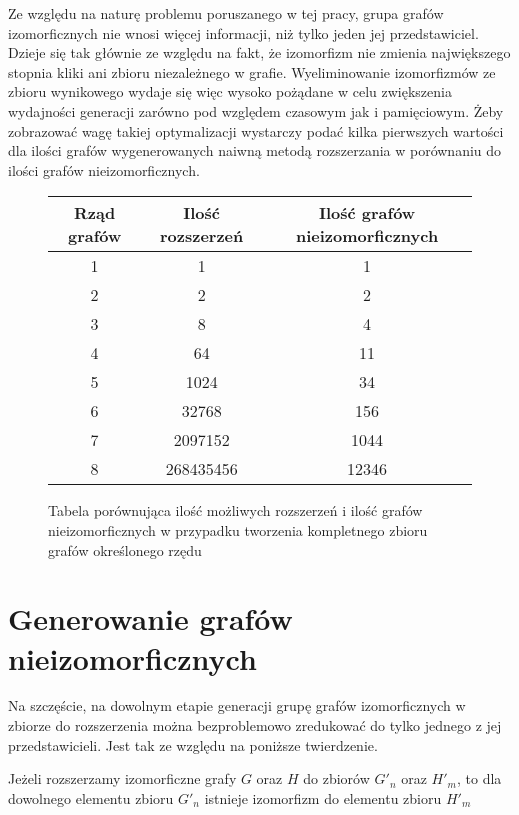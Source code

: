  Ze względu na naturę problemu poruszanego w tej pracy, grupa grafów izomorficznych nie wnosi więcej informacji, niż tylko jeden jej przedstawiciel. Dzieje się tak głównie ze względu na fakt, że izomorfizm nie zmienia największego stopnia kliki ani zbioru niezależnego w grafie. Wyeliminowanie izomorfizmów ze zbioru wynikowego wydaje się więc wysoko pożądane w celu zwiększenia wydajności generacji zarówno pod względem czasowym jak i pamięciowym. Żeby zobrazować wagę takiej optymalizacji wystarczy podać kilka pierwszych wartości dla ilości grafów wygenerowanych naiwną metodą rozszerzania w porównaniu do ilości grafów nieizomorficznych.
 \begin{figure}[H]
 \begin{center}
 \begin{tabular}{|c c c|} 
 \hline
 Rząd grafów & Ilość rozszerzeń\cite{OEIS2} & Ilość grafów nieizomorficznych\cite{OEIS}  \\ 
 \hline\hline
 1 & 1 & 1  \\ 
 \hline
 2 & 2 & 2  \\
 \hline
 3 & 8 & 4  \\
 \hline
 4 & 64 & 11  \\
 \hline
 5 & 1024 & 34  \\
 \hline
 6 & 32768 & 156  \\
 \hline
 7 & 2097152 & 1044  \\
 \hline
 8 & 268435456 & 12346  \\
 \hline
\end{tabular}
\end{center}
 \caption{Tabela porównująca ilość możliwych rozszerzeń i ilość grafów nieizomorficznych w przypadku tworzenia kompletnego zbioru grafów określonego rzędu}
 \end{figure}

\section{Generowanie grafów nieizomorficznych}
Na szczęście, na dowolnym etapie generacji grupę grafów izomorficznych w zbiorze do rozszerzenia można bezproblemowo zredukować do tylko jednego z jej przedstawicieli. Jest tak ze względu na poniższe twierdzenie.
\begin{theorem}
Jeżeli rozszerzamy izomorficzne grafy $G$ oraz $H$ do zbiorów $G'_n$ oraz $H'_m$, to dla dowolnego elementu zbioru $G'_n$ istnieje izomorfizm do elementu zbioru $H'_m$
\end{theorem}


